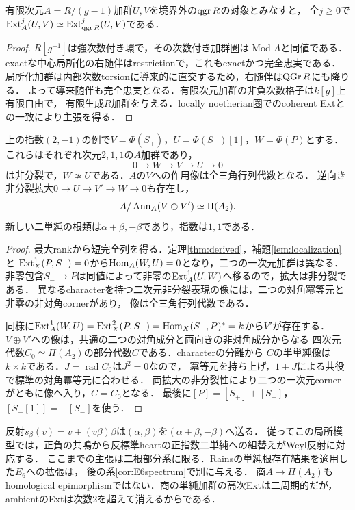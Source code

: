 \begin{lemma}[境界外でのExtの比較]\label{lem:localization}
有限次元$A=R/(g-1)$加群$U,V$を境界外の$\operatorname{qgr} R$の対象とみなすと，
全$j\ge0$で$\operatorname{Ext}_A^j(U,V)\simeq\operatorname{Ext}_{\operatorname{qgr} R}^j(U,V)$である．
\end{lemma}
\begin{proof}
$R[g^{-1}]$は強次数付き環で，その次数付き加群圏は$\operatorname{Mod}A$と同値である．
exactな中心局所化の右随伴はrestrictionで，これもexactかつ完全忠実である．
局所化加群は内部次数torsionに導来的に直交するため，右随伴は$\operatorname{QGr} R$にも降りる．
よって導来随伴も完全忠実となる．有限次元加群の非負次数格子は$k[g]$上有限自由で，
有限生成$R$加群を与える．locally noetherian圏でのcoherent Extとの一致により主張を得る．
\end{proof}

\begin{theorem}[三角表現と四次元商]\label{thm:affinequotient}
上の指数$(2,-1)$の例で$V=\Phi(S_+)$，$U=\Phi(S_-)[1]$，$W=\Phi(P)$とする．
これらはそれぞれ次元$2,1,1$の$A$加群であり，
\[
0\longrightarrow W\longrightarrow V\longrightarrow U\longrightarrow0
\]
は非分裂で，$W\not\simeq U$である．$A$の$V$への作用像は全三角行列代数となる．
逆向き非分裂拡大$0\to U\to V'\to W\to0$も存在し，
\[
A/\operatorname{Ann}_A(V\oplus V')\simeq\Pi(A_2).
\]
新しい二単純の根類は$\alpha+\beta,-\beta$であり，指数は$1,1$である．
\end{theorem}
\begin{proof}
最大rankから短完全列を得る．定理\ref{thm:derived}，補題\ref{lem:localization}と
$\operatorname{Ext}_X^1(P,S_-)=0$から$\operatorname{Hom}_A(W,U)=0$となり，二つの一次元加群は異なる．
非零包含$S_-\to P$は同値によって非零の$\operatorname{Ext}_A^1(U,W)$へ移るので，拡大は非分裂である．
異なるcharacterを持つ二次元非分裂表現の像には，二つの対角冪等元と非零の非対角cornerがあり，
像は全三角行列代数である．

同様に$\operatorname{Ext}_A^1(W,U)=\operatorname{Ext}_X^2(P,S_-)=\operatorname{Hom}_X(S_-,P)^*=k$から$V'$が存在する．
$V\oplus V'$への像は，共通の二つの対角成分と両向きの非対角成分からなる
四次元代数$C_0\simeq\Pi(A_2)$の部分代数$C$である．characterの分離から
$C$の半単純像は$k\times k$である．$J=\operatorname{rad}C_0$は$J^2=0$なので，
冪等元を持ち上げ，$1+J$による共役で標準の対角冪等元に合わせる．
両拡大の非分裂性により二つの一次元cornerがともに像へ入り，$C=C_0$となる．
最後に$[P]=[S_+]+[S_-]$，$[S_-[1]]=-[S_-]$を使う．
\end{proof}

反射$s_\beta(v)=v+(v\beta)\beta$は$(\alpha,\beta)$を$(\alpha+\beta,-\beta)$へ送る．
従ってこの局所模型では，正負の共鳴から反標準heartの正指数二単純への組替えがWeyl反射に対応する．
ここまでの主張は二根部分系に限る．Rainsの単純根存在結果を適用した$E_6$への拡張は，
後の系\ref{cor:E6spectrum}で別に与える．
商$A\to\Pi(A_2)$もhomological epimorphismではない．商の単純加群の高次Extは二周期的だが，
ambientのExtは次数2を超えて消えるからである．

